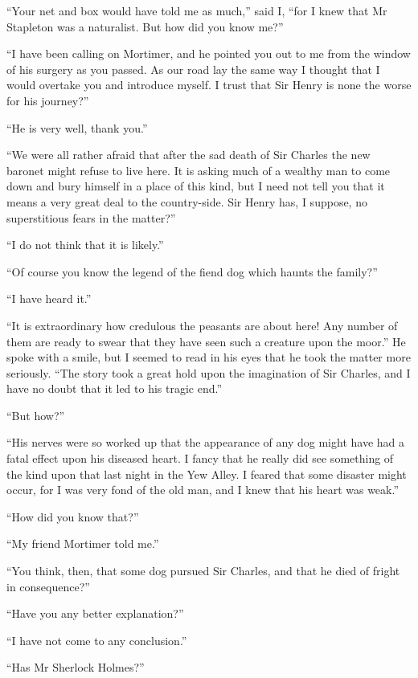 \documentclass[paper=5.5in:8.5in,BCOR=7mm,twoside,DIV=calc,12pt,usegeometry,openany,chapterprefix,endperiod]{scrbook} %
\begin{document}
\enquote{Your net and box would have told me as much,} said I, \enquote{for I knew that Mr Stapleton was a naturalist. But how did you know me?}

\enquote{I have been calling on Mortimer, and he pointed you out to me from the window of his surgery as you passed. As our road lay the same way I thought that I would overtake you and introduce myself. I trust that Sir Henry is none the worse for his journey?}

\enquote{He is very well, thank you.}

\enquote{We were all rather afraid that after the sad death of Sir Charles the new baronet might refuse to live here. It is asking much of a wealthy man to come down and bury himself in a place of this kind, but I need not tell you that it means a very great deal to the country-side. Sir Henry has, I suppose, no superstitious fears in the matter?}

\enquote{I do not think that it is likely.}

\enquote{Of course you know the legend of the fiend dog which haunts the family?}

\enquote{I have heard it.}

\enquote{It is extraordinary how credulous the peasants are about here! Any number of them are ready to swear that they have seen such a creature upon the moor.} He spoke with a smile, but I seemed to read in his eyes that he took the matter more seriously. \enquote{The story took a great hold upon the imagination of Sir Charles, and I have no doubt that it led to his tragic end.}

\enquote{But how?}

\enquote{His nerves were so worked up that the appearance of any dog might have had a fatal effect upon his diseased heart. I fancy that he really did see something of the kind upon that last night in the Yew Alley. I feared that some disaster might occur, for I was very fond of the old man, and I knew that his heart was weak.}

\enquote{How did you know that?}

\enquote{My friend Mortimer told me.}

\enquote{You think, then, that some dog pursued Sir Charles, and that he died of fright in consequence?}

\enquote{Have you any better explanation?}

\enquote{I have not come to any conclusion.}

\enquote{Has Mr Sherlock Holmes?}
\end{document}
